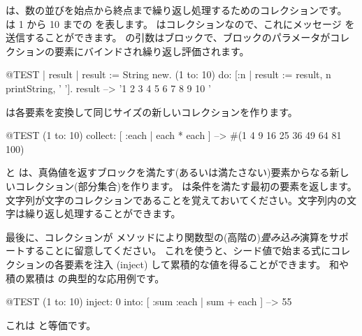 \documentclass[a4paper,10pt,twoside]{book}
\begin{document}
 は、数の並びを始点から終点まで繰り返し処理するためのコレクションです。
は 1 から 10 までの  を表します。
 はコレクションなので、これにメッセージ  を送信することができます。
 の引数はブロックで、ブロックのパラメータがコレクションの要素にバインドされ繰り返し評価されます。

\begin{code}{@TEST | result |}
result := String new.
(1 to: 10) do: [:n | result := result, n printString, ' '].
result --> '1 2 3 4 5 6 7 8 9 10 '
\end{code}


 は各要素を変換して同じサイズの新しいコレクションを作ります。
\begin{code}{@TEST}
(1 to: 10) collect: [ :each | each * each ] --> #(1 4 9 16 25 36 49 64 81 100)
\end{code}

 と  は、真偽値を返すブロックを満たす(あるいは満たさない)要素からなる新しいコレクション(部分集合)を作ります。
 は条件を満たす最初の要素を返します。
文字列が文字のコレクションであることを覚えておいてください。文字列内の文字は繰り返し処理することができます。


最後に、コレクションが  メソッドにより関数型の(高階の)\emph{畳み込み}演算をサポートすることに留意してください。
これを使うと、シード値で始まる式にコレクションの各要素を注入 (inject) して累積的な値を得ることができます。
和や積の累積は  の典型的な応用例です。

\begin{code}{@TEST}
(1 to: 10) inject: 0 into: [ :sum :each | sum + each ] --> 55
\end{code}

\noindent
これは と等価です。
\end{document}
